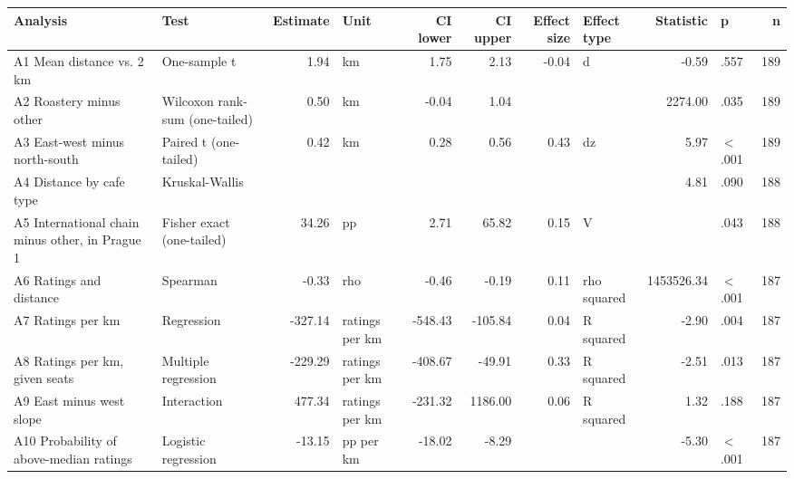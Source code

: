 \begingroup\footnotesize
\begin{tabular}{llrlrrrlrlr}
  \toprule
Analysis & Test & Estimate & Unit & CI lower & CI upper & Effect size & Effect type & Statistic & p & n \\ 
  \midrule
A1 Mean distance vs. 2 km & One-sample t & 1.94 & km & 1.75 & 2.13 & -0.04 & d & -0.59 & .557 & 189 \\ 
  A2 Roastery minus other & Wilcoxon rank-sum (one-tailed) & 0.50 & km & -0.04 & 1.04 &  &  & 2274.00 & .035 & 189 \\ 
  A3 East-west minus north-south & Paired t (one-tailed) & 0.42 & km & 0.28 & 0.56 & 0.43 & dz & 5.97 & $<$.001 & 189 \\ 
  A4 Distance by cafe type & Kruskal-Wallis &  &  &  &  &  &  & 4.81 & .090 & 188 \\ 
  A5 International chain minus other, in Prague 1 & Fisher exact (one-tailed) & 34.26 & pp & 2.71 & 65.82 & 0.15 & V &  & .043 & 188 \\ 
  A6 Ratings and distance & Spearman & -0.33 & rho & -0.46 & -0.19 & 0.11 & rho squared & 1453526.34 & $<$.001 & 187 \\ 
  A7 Ratings per km & Regression & -327.14 & ratings per km & -548.43 & -105.84 & 0.04 & R squared & -2.90 & .004 & 187 \\ 
  A8 Ratings per km, given seats & Multiple regression & -229.29 & ratings per km & -408.67 & -49.91 & 0.33 & R squared & -2.51 & .013 & 187 \\ 
  A9 East minus west slope & Interaction & 477.34 & ratings per km & -231.32 & 1186.00 & 0.06 & R squared & 1.32 & .188 & 187 \\ 
  A10 Probability of above-median ratings & Logistic regression & -13.15 & pp per km & -18.02 & -8.29 &  &  & -5.30 & $<$.001 & 187 \\ 
   \bottomrule
\end{tabular}
\endgroup
